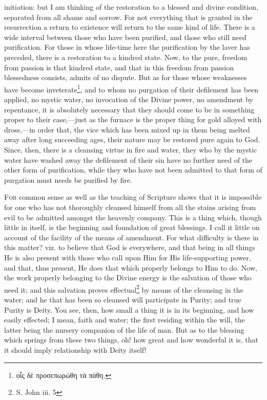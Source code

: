 initiation: but I am thinking of the restoration to a blessed and divine condition, separated from all shame and sorrow. For not everything that is granted in the resurrection a return to existence will return to the same kind of life. There is a wide interval between those who have been purified, and those who still need purification. For those in whose life-time here the purification by the laver has preceded, there is a restoration to a kindred state. Now, to the pure, freedom from passion is that kindred state, and that in this freedom from passion blessedness consists, admits of no dispute. But as for those whose weaknesses have become inveterate\footnote{\textgreek{οἷς δὲ προσεπωρώθη τὰ πάθη}.}, and to whom no purgation of their defilement has been applied, no mystic water, no invocation of the Divine power, no amendment by repentance, it is absolutely necessary that they should come to be in something proper to their case,—just as the furnace is the proper thing for gold alloyed with dross,—in order that, the vice which has been mixed up in them being melted away after long succeeding ages, their nature may be restored pure again to God. Since, then, there is a cleansing virtue in fire and water, they who by the mystic water have washed away the defilement of their sin have no further need of the other form of purification, while they who have not been admitted to that form of purgation must needs be purified by fire.


\textsc{For} common sense as well as the teaching of Scripture shows that it is impossible for one who has not thoroughly cleansed himself from all the stains arising from evil to be admitted amongst the heavenly company. This is a thing which, though little in itself, is the beginning and foundation of great blessings. I call it little on account of the facility of the means of amendment. For what difficulty is there in this matter? viz. to believe that God is everywhere, and that being in all things He is also present with those who call upon Him for His life-supporting power, and that, thus present, He does that which properly belongs to Him to do. Now, the work properly belonging to the Divine energy is the salvation of those who need it; and this salvation proves effectual\footnote{S. John iii. 5} by means of the cleansing in the water; and he that has been so cleansed will participate in Purity; and true Purity is Deity. You see, then, how small a thing it is in its beginning, and how easily effected; I mean, faith and water; the first residing within the will, the latter being the nursery companion of the life of man. But as to the blessing which springs from these two things, oh! how great and how wonderful it is, that it should imply relationship with Deity itself!

